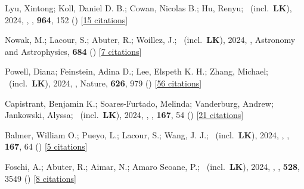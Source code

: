\item[{\color{numcolor}\scriptsize105}] Lyu, Xintong; Koll, Daniel D. B.; Cowan, Nicolas B.; Hu, Renyu; \etal\ (incl.\ \textbf{LK}), 2024, , \apj, \textbf{964}, 152 () [\href{https://ui.adsabs.harvard.edu/abs/2024ApJ...964..152L}{15 citations}]

\item[{\color{numcolor}\scriptsize104}] Nowak, M.; Lacour, S.; Abuter, R.; Woillez, J.; \etal\ (incl.\ \textbf{LK}), 2024, , Astronomy and Astrophysics, \textbf{684} () [\href{https://ui.adsabs.harvard.edu/abs/2024A&A...684A.184N}{7 citations}]

\item[{\color{numcolor}\scriptsize103}] Powell, Diana; Feinstein, Adina D.; Lee, Elspeth K. H.; Zhang, Michael; \etal\ (incl.\ \textbf{LK}), 2024, , Nature, \textbf{626}, 979 () [\href{https://ui.adsabs.harvard.edu/abs/2024Natur.626..979P}{56 citations}]

\item[{\color{numcolor}\scriptsize102}] Capistrant, Benjamin K.; Soares-Furtado, Melinda; Vanderburg, Andrew; Jankowski, Alyssa; \etal\ (incl.\ \textbf{LK}), 2024, , \aj, \textbf{167}, 54 () [\href{https://ui.adsabs.harvard.edu/abs/2024AJ....167...54C}{21 citations}]

\item[{\color{numcolor}\scriptsize101}] Balmer, William O.; Pueyo, L.; Lacour, S.; Wang, J. J.; \etal\ (incl.\ \textbf{LK}), 2024, , \aj, \textbf{167}, 64 () [\href{https://ui.adsabs.harvard.edu/abs/2024AJ....167...64B}{5 citations}]

\item[{\color{numcolor}\scriptsize100}] Foschi, A.; Abuter, R.; Aimar, N.; Amaro Seoane, P.; \etal\ (incl.\ \textbf{LK}), 2024, , \mnras, \textbf{528}, 3549 () [\href{https://ui.adsabs.harvard.edu/abs/2024MNRAS.528.3549F}{8 citations}]

